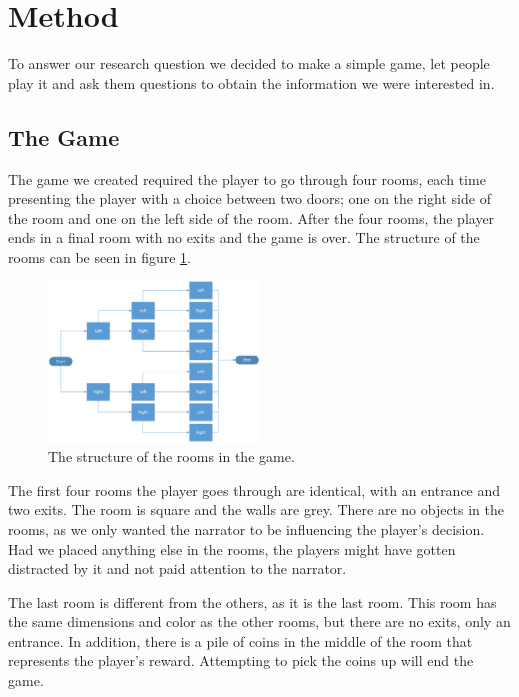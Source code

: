 \section{Method}
\label{Method}

To answer our research question we decided to make a simple game, let people play it and ask them questions to obtain the information we were interested in.


\subsection{The Game}
\label{Method_Game}

The game we created required the player to go through four rooms, each time presenting the player with a choice between two doors; one on the right side of the room and one on the left side of the room. After the four rooms, the player ends in a final room with no exits and the game is over. The structure of the rooms can be seen in figure \ref{fig:RoomStructure}.

\begin{figure}[h!]
  \centering
\includegraphics[width=0.5\textwidth]{Parts/RoomStructure}
\caption{The structure of the rooms in the game.}
\label{fig:RoomStructure}
\end{figure}

The first four rooms the player goes through are identical, with an entrance and two exits. The room is square and the walls are grey. There are no objects in the rooms, as we only wanted the narrator to be influencing the player's decision. Had we placed anything else in the rooms, the players might have gotten distracted by it and not paid attention to the narrator.

The last room is different from the others, as it is the last room. This room has the same dimensions and color as the other rooms, but there are no exits, only an entrance. In addition, there is a pile of coins in the middle of the room that represents the player's reward. Attempting to pick the coins up will end the game.

